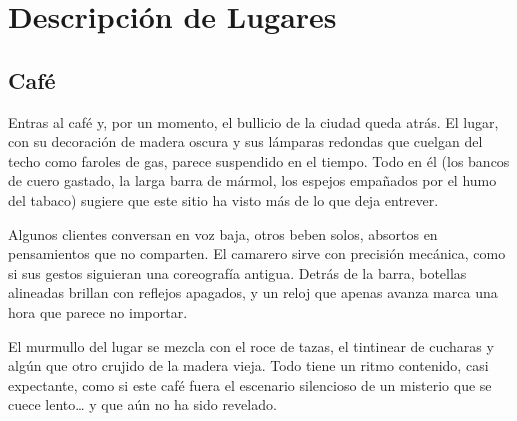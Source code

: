 \chapter{Descripción de Lugares}

\section{Café} 

Entras al café y, por un momento, el bullicio de la ciudad queda atrás.
El lugar, con su decoración de madera oscura y sus lámparas redondas que
cuelgan del techo como faroles de gas, parece suspendido en el tiempo. Todo en
él (los bancos de cuero gastado, la larga barra de mármol, los espejos
empañados por el humo del tabaco) sugiere que este sitio ha visto más de lo que
deja entrever.

Algunos clientes conversan en voz baja, otros beben solos, absortos en
pensamientos que no comparten. El camarero sirve con precisión mecánica, como
si sus gestos siguieran una coreografía antigua. Detrás de la barra, botellas
alineadas brillan con reflejos apagados, y un reloj que apenas avanza marca una
hora que parece no importar.

El murmullo del lugar se mezcla con el roce de tazas, el tintinear de cucharas
y algún que otro crujido de la madera vieja. Todo tiene un ritmo contenido,
casi expectante, como si este café fuera el escenario silencioso de un misterio
que se cuece lento… y que aún no ha sido revelado.

